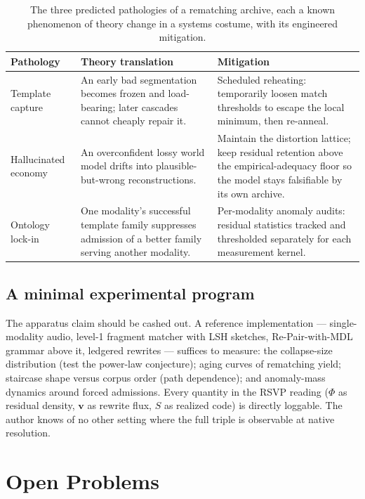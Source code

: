 \documentclass[11pt,oneside]{book}
\theoremstyle{remark}
\newcommand{\Phiv}{\Phi}
\newcommand{\vv}{\mathbf{v}}
\newcommand{\Sv}{S}
\begin{document}
\begin{table}[ht]
\centering
\small
\begin{tabular}{@{}p{2.7cm}p{4.6cm}p{4.6cm}@{}}
\toprule
\textbf{Pathology} & \textbf{Theory translation} &
\textbf{Mitigation} \\
\midrule
Template capture & An early bad segmentation becomes frozen and
load-bearing; later cascades cannot cheaply repair it. & Scheduled
reheating: temporarily loosen match thresholds to escape the local
minimum, then re-anneal. \\[4pt]
Hallucinated economy & An overconfident lossy world model drifts into
plausible-but-wrong reconstructions. & Maintain the distortion
lattice; keep residual retention above the empirical-adequacy floor so
the model stays falsifiable by its own archive. \\[4pt]
Ontology lock-in & One modality's successful template family
suppresses admission of a better family serving another modality. &
Per-modality anomaly audits: residual statistics tracked and
thresholded separately for each measurement kernel. \\
\bottomrule
\end{tabular}
\caption{The three predicted pathologies of a rematching archive, each
a known phenomenon of theory change in a systems costume, with its
engineered mitigation.}
\label{tab:pathologies}
\end{table}

\section{A minimal experimental program}

The apparatus claim should be cashed out. A reference implementation ---
single-modality audio, level-1 fragment matcher with LSH sketches,
Re-Pair-with-MDL grammar above it, ledgered rewrites --- suffices to
measure: the collapse-size distribution (test the power-law
conjecture); aging curves of rematching yield; staircase shape versus
corpus order (path dependence); and anomaly-mass dynamics around forced
admissions. Every quantity in the RSVP reading ($\Phiv$ as residual
density, $\vv$ as rewrite flux, $\Sv$ as realized code) is directly
loggable. The author knows of no other setting where the full triple is
observable at native resolution.

\chapter{Open Problems}
\end{document}
